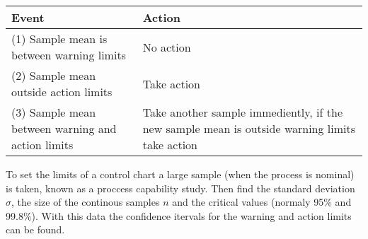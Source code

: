         \begin{center}
        \end{center}

        \begin{center}
        \begin{tabularx}{\textwidth}{l|X}
        Event & Action \\
        \hline
        (1) Sample mean is between warning limits & No action \\
        (2) Sample mean outside action limits & Take action \\
        (3) Sample mean between warning and action limits & Take another sample immediently, if the new sample mean is outside warning limits take action \\
        \end{tabularx}
        \end{center}

        \noindent
        To set the limits of a control chart a large sample (when the process is nominal) is taken, known as a proccess capability study. Then find the standard deviation $\sigma$, the size of the continous samples $n$ and the critical values (normaly 95\% and 99.8\%). With this data the confidence itervals for the warning and action limits can be found.

